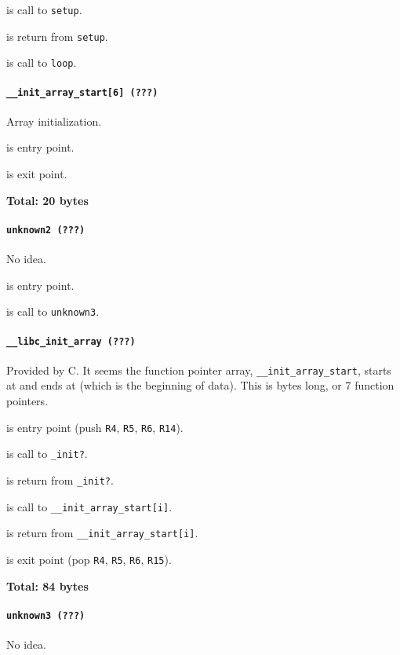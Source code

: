  is call to \texttt{setup}.

 is return from \texttt{setup}.

 is call to \texttt{loop}.

\paragraph{\texttt{\_\_init\_array\_start[6] (???)}} Array initialization.

 is entry point.

 is exit point.

\textbf{Total: 20 bytes}

\paragraph{\texttt{unknown2 (???)}} No idea.

 is entry point.

 is call to \texttt{unknown3}.

\paragraph{\texttt{\_\_libc\_init\_array (???)}} Provided by C. It seems the
function pointer array,  \texttt{\_\_init\_array\_start}, starts at
 and ends at  (which is the beginning of
data). This is  bytes long, or 7 function pointers.

 is entry point (push \texttt{R4}, \texttt{R5},
\texttt{R6}, \texttt{R14}).

 is call to \texttt{\_init?}.

 is return from \texttt{\_init?}.

 is call to \texttt{\_\_init\_array\_start[i]}.

 is return from \texttt{\_\_init\_array\_start[i]}.

 is exit point (pop \texttt{R4}, \texttt{R5},
\texttt{R6}, \texttt{R15}).

\textbf{Total: 84 bytes}

\paragraph{\texttt{unknown3 (???)}} No idea.

